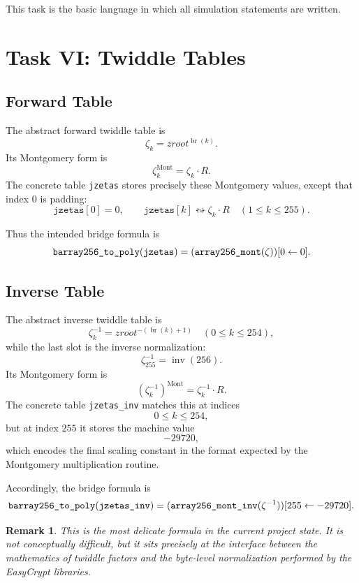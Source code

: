 \documentclass[11pt]{article}
\newtheorem{remark}{Remark}
\newcommand{\code}[1]{\text{\texttt{#1}}}
\begin{document}
This task is the basic language in which all simulation statements are
written.

\section{Task VI: Twiddle Tables}

\subsection{Forward Table}

The abstract forward twiddle table is
\[
\zeta_k = zroot^{\operatorname{br}(k)}.
\]
Its Montgomery form is
\[
\zeta_k^{\mathrm{Mont}} = \zeta_k \cdot R.
\]
The concrete table \texttt{jzetas} stores precisely these Montgomery values,
except that index \(0\) is padding:
\[
\texttt{jzetas}[0] = 0,
\qquad
\texttt{jzetas}[k] \leftrightsquigarrow \zeta_k \cdot R
\quad (1 \le k \le 255).
\]

Thus the intended bridge formula is
\[
\code{barray256\_to\_poly}(\texttt{jzetas})
=
(\code{array256\_mont}(\zeta))[0 \leftarrow 0].
\]

\subsection{Inverse Table}

The abstract inverse twiddle table is
\[
\zeta_k^{-1} = zroot^{-(\operatorname{br}(k)+1)}
\quad (0 \le k \le 254),
\]
while the last slot is the inverse normalization:
\[
\zeta_{255}^{-1} = \operatorname{inv}(256).
\]
Its Montgomery form is
\[
(\zeta_k^{-1})^{\mathrm{Mont}} = \zeta_k^{-1}\cdot R.
\]
The concrete table \texttt{jzetas\_inv} matches this at indices
\[
0 \le k \le 254,
\]
but at index \(255\) it stores the machine value
\[
-29720,
\]
which encodes the final scaling constant in the format expected by the
Montgomery multiplication routine.

Accordingly, the bridge formula is
\[
\code{barray256\_to\_poly}(\texttt{jzetas\_inv})
=
(\code{array256\_mont\_inv}(\zeta^{-1}))[255 \leftarrow -29720].
\]

\begin{remark}
This is the most delicate formula in the current project state. It is not
conceptually difficult, but it sits precisely at the interface between the
mathematics of twiddle factors and the byte-level normalization performed by
the EasyCrypt libraries.
\end{remark}
\end{document}
